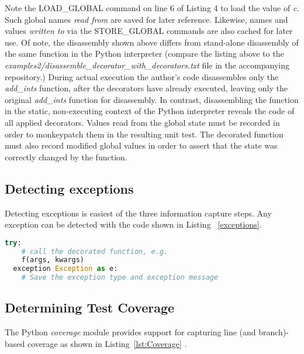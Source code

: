 \documentclass[10pt, conference]{IEEEtran}
\begin{document}
Note the LOAD\_GLOBAL command on line 6 of Listing 4 to load the value of 
\textit{c}.  Such global names \textit{read from} are saved for later reference.  
Likewise, names and values \textit{written to} via 
the STORE\_GLOBAL commands are also cached for later use.
Of note, the disassembly shown above differs from stand-alone disassembly of 
the same function in the Python interpreter (compare the listing above to the
\textit{examples2/disassemble\_decorator\_with\_decorators.txt} file in the 
accompanying repository.)
During actual execution the author's code disassembles only the
\textit{add\_ints} function, after the decorators
have already executed, leaving only the original  \textit{add\_ints}
function for disassembly.
In contrast, disassembling the function in the static, non-executing context of
the Python interpreter reveals the code of all applied decorators.  
Values read from the global state must be recorded 
in order to monkeypatch them in the resulting unit test.
The decorated function must also record modified global values in
order to assert that the state was correctly changed by the function.

\subsection{Detecting exceptions}\label{sec:approach-internal-3}
Detecting exceptions is easiest of the three information capture steps.
Any exception can be detected with the code shown in Listing 
~\ref{exceptions}.

\begin{lstlisting}[language=Python, caption={Catching and recording exceptions}, label={exceptions}]
  try:
    # call the decorated function, e.g.
    f(args, kwargs)
  exception Exception as e:
    # Save the exception type and exception message
  \end{lstlisting}

\subsection{Determining Test Coverage}\label{sec:approach-internal-4}
The Python \textit{coverage}
module provides support for capturing line (and branch)-based coverage
as shown in Listing~\ref{lst:Coverage} \cite{batchelder2024}.


\end{document}

